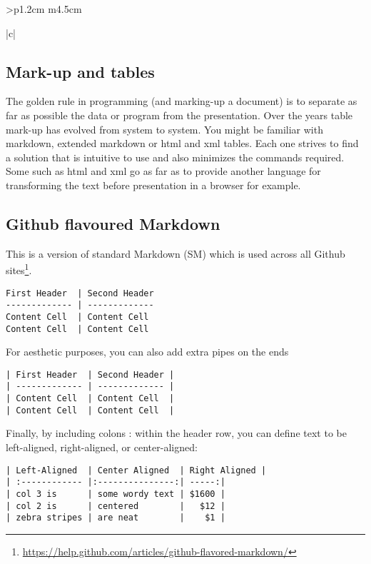 \begin{tabular}{>{\bfseries}p{1.2cm} m{4.5cm}}
\begin{tabular}[t]{|c|}
\begin{longtable}
\begin{scriptexample}{}{}
\pgfplotstablesort{}
\pgfplotstabletypeset[columns/c/.style={string type}]{\result}%



\section{Mark-up and tables}

The golden rule in programming (and marking-up a document)  is to separate
as far as possible the data or program from the presentation. Over the years table mark-up has evolved from system to system. You might be familiar with markdown, extended markdown or html and xml tables. Each one strives to find a solution that is intuitive to use and also minimizes the commands required. Some such as html and xml go as far as to provide another language for transforming the text before presentation in a browser for example.

\subsection{Github flavoured Markdown}

This is a version of standard Markdown (SM) which is used across all Github sites\footnote{ \url{https://help.github.com/articles/github-flavored-markdown/}}. 

\begin{scriptexample}{}{}
\begin{verbatim}
First Header  | Second Header
------------- | -------------
Content Cell  | Content Cell
Content Cell  | Content Cell
\end{verbatim}
\end{scriptexample}

For aesthetic purposes, you can also add extra pipes on the ends

\begin{verbatim}
| First Header  | Second Header |
| ------------- | ------------- |
| Content Cell  | Content Cell  |
| Content Cell  | Content Cell  |
\end{verbatim}

Finally, by including colons : within the header row, you can define text to be left-aligned, right-aligned, or center-aligned:

\begin{verbatim}
| Left-Aligned  | Center Aligned  | Right Aligned |
| :------------ |:---------------:| -----:|
| col 3 is      | some wordy text | $1600 |
| col 2 is      | centered        |   $12 |
| zebra stripes | are neat        |    $1 |
\end{verbatim}



\end{scriptexample}
\end{longtable}
\end{tabular}
\end{tabular}
